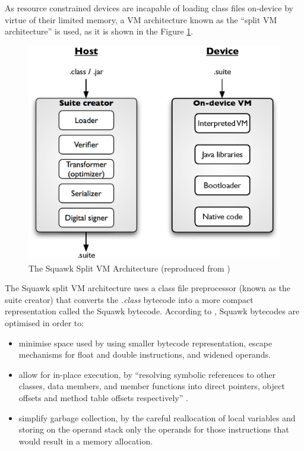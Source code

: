 As resource constrained devices are incapable of loading class files on-device
by virtue of their limited memory, a VM architecture known as the ``split VM
architecture'' is used, as it is shown in the Figure
\ref{Fig:SquawkVM_architecture}.

\begin{figure}[h]
\centering
\includegraphics[scale=0.61]{img/Squawk_architecture.eps} 
\caption[The Squawk Split VM Architecture]{The Squawk
Split VM Architecture (reproduced from \cite{simon_squawk:2006})}
\label{Fig:SquawkVM_architecture}
\end{figure}  

The Squawk split VM architecture uses a class file preprocessor (known as the
suite creator) that converts the \emph{.class} bytecode into a more compact
representation called the Squawk bytecode. According to
\cite{simon_squawk:2006}, Squawk bytecodes are optimised in order to:
\begin{itemize}
\item minimise space used by using smaller bytecode representation, escape
mechanisms for float and double instructions, and widened operands. 
\item allow for in-place execution, by ``resolving symbolic references to other
classes, data members, and member functions into direct pointers, object offsets
and method table offsets respectively'' \cite{simon_squawk:2006}.
\item simplify garbage collection, by the careful reallocation of local
variables and storing on the operand stack only the operands for those
instructions that would result in a memory allocation.
\end{itemize}

